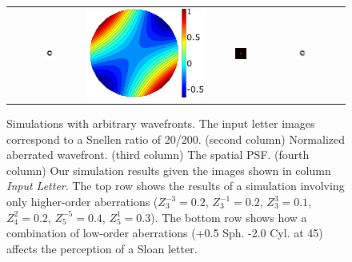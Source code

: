 \begin{figure}[!htb]
\begin{tabular}{@{}r@{ } c@{ } c@{ } c@{ } c@{ } c }
	\begin{sideways} \parbox[b]{25mm} {} \end{sideways} &
	\includegraphics[width= 0.22\textwidth]{../../__Images/05/synthetic_sims/C_20-200@4x.png} &
	\includegraphics[height=0.22\textwidth]{../../__Images/05/synthetic_sims/Wavefront_0,5D,-2@45.png} &
	\includegraphics[width= 0.22\textwidth]{../../__Images/05/synthetic_sims/PSF_0,5D,-2@45.png} &
	\includegraphics[width= 0.22\textwidth]{../../__Images/05/synthetic_sims/C_20-200_f50_simulated(0,5D,-2@45).png} 			\\

	\end{tabular}
	
	\caption{Simulations with arbitrary wavefronts. The input letter images correspond to a Snellen ratio of 20/200. (second column) Normalized aberrated wavefront. (third column) The spatial PSF. (fourth column) Our simulation results given the images shown in column \emph{Input Letter}. The top row shows the results of a simulation involving only higher-order aberrations ($Z^{-3}_{3}=0.2$, $Z^{-1}_{3}=0.2$, $Z^{3}_{3}=0.1$, $Z^{2}_{4}=0.2$, $Z^{-5}_{5}=0.4$, $Z^{1}_{5}=0.3$). The bottom row shows how a combination of low-order aberrations (+0.5 Sph. -2.0 Cyl. at 45) affects the perception of a Sloan letter.}
	\label{fig:synthetic_sims}
\end{figure}
